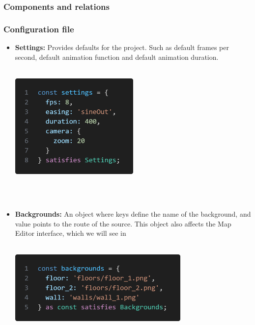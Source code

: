 \documentclass{article}
\begin{document}
\subsubsection{Components and relations}
\subsubsection{Configuration file}

\begin{itemize}
    \item \textbf{Settings:} Provides defaults for the project. Such as default frames per second, default animation function and default animation duration.\\\\
    \begin{minipage}{\linewidth}
        \centering
        \includegraphics[width=0.5\textwidth]{settings.png}
    \end{minipage}\\\\
    
    \item \textbf{Backgrounds:} An object where keys define the name of the background, and value points to the route of the source. This object also affects the Map Editor interface, which we will see in \\\\
    \begin{minipage}{\linewidth}
        \centering
        \includegraphics[width=0.7\textwidth]{backgrounds.png}
    \end{minipage}\\\\


\end{itemize}
\end{document}
